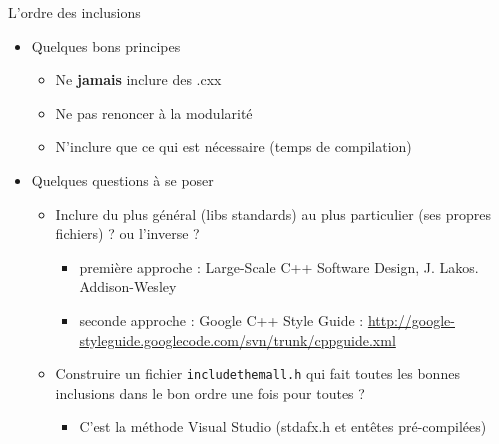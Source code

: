\begin{frame}{L'ordre des inclusions}
\begin{itemize}
\item Quelques bons principes
\begin{itemize}
\item Ne \textbf{jamais} inclure des .cxx
\item Ne pas renoncer à la modularité
\item N'inclure que ce qui est nécessaire (temps de compilation)
\end{itemize}
\item Quelques questions à se poser
\begin{itemize}
\item Inclure du plus général (libs standards) au plus particulier (ses propres fichiers) ? ou l'inverse ?
\begin{itemize}
\item première approche : Large-Scale C++ Software Design, J. Lakos. Addison-Wesley
\item seconde approche : Google C++ Style Guide : \url{http://google-styleguide.googlecode.com/svn/trunk/cppguide.xml}

\end{itemize}
\item Construire un fichier \texttt{includethemall.h} qui fait toutes les bonnes inclusions dans le bon ordre une fois pour toutes ?
\begin{itemize}
	\item C'est la méthode Visual Studio (stdafx.h et entêtes pré-compilées)
\end{itemize}
\end{itemize}
\end{itemize}
\end{frame}

